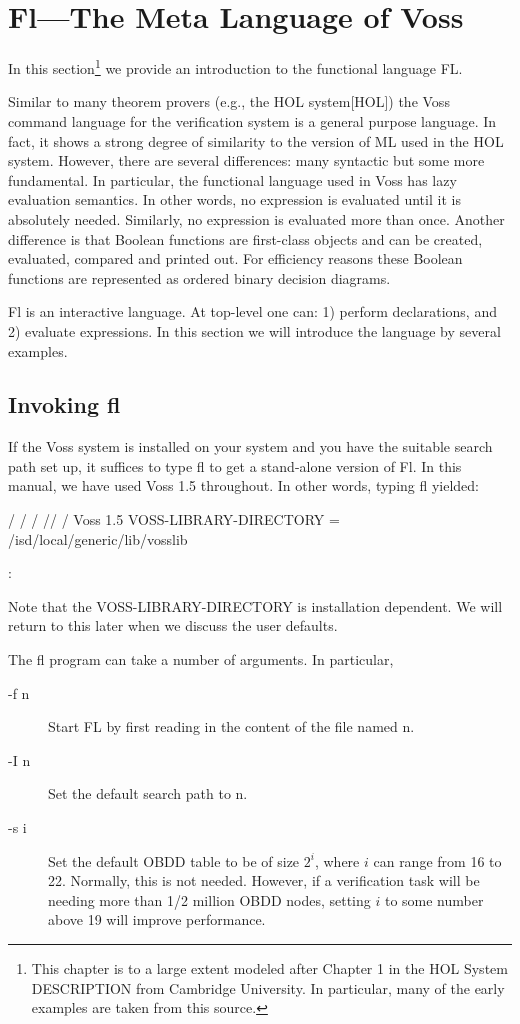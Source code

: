 \section{Fl---The Meta Language of Voss}

In this section\footnote{This chapter is to a
large extent modeled after Chapter 1 in the HOL System DESCRIPTION
from Cambridge University. In particular, many of the early examples are
taken from this source.} we provide an introduction to
the functional language FL.

Similar to many theorem provers (e.g., the HOL system[HOL]) the
Voss command language for the verification system is a general
purpose language. In fact, it shows a strong degree of similarity
to the version of ML used in the HOL system. However, there are
several differences:  many syntactic but some more fundamental. In
particular, the functional language used in Voss has lazy evaluation
semantics. In other words, no expression is evaluated until it is
absolutely needed. Similarly, no expression is evaluated more than
once. Another difference is that Boolean functions are first-class
objects and can be created, evaluated, compared and printed out.
For efficiency reasons these Boolean functions are represented as
ordered binary decision diagrams. 

Fl is an interactive language. At top-level one can:
1) perform declarations, and 2) evaluate expressions.
In this section we will introduce the language by several examples.

\subsection{Invoking fl}

If the Voss system is installed on your system
and you have the suitable search path set up, it suffices
to type fl to get a stand-alone version of Fl. In this manual, we
have used Voss 1.5 throughout. In other words, typing fl yielded:

\begin{hol}
      /\verb@\@
     /  \verb@\@/\verb@\@
 /\verb@\@ /      \verb@\@
/  Voss 1.5 \verb@\@
VOSS-LIBRARY-DIRECTORY = /isd/local/generic/lib/vosslib

:
\end{hol}
Note that the VOSS-LIBRARY-DIRECTORY is installation dependent.
We will return to this later when we discuss the user defaults.

The fl program can take a number of arguments.
In particular, 
\begin{description}
\item[-f n]
Start FL by first reading in the content of the file named n.
\item[-I n]
Set the default search path to n.
\item[-s i]
Set the default OBDD table to be of size $2^i$, where $i$ can range
from 16 to 22.
Normally, this is not needed.
However, if a verification task will be needing more than 1/2 million
OBDD nodes, setting $i$ to some number above 19 will improve performance.
\end{description}

